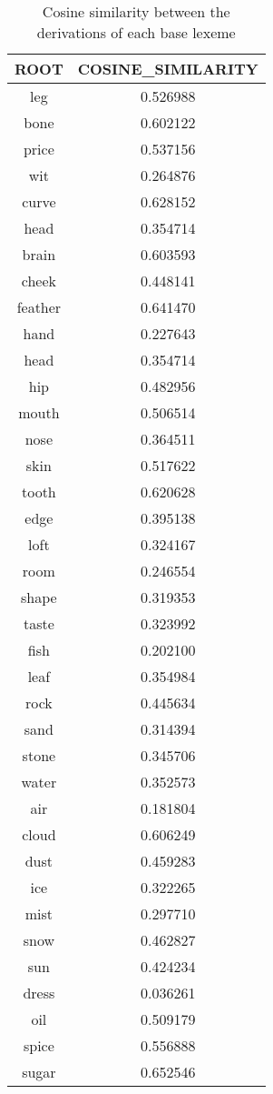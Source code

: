\documentclass[12pt]{article}
\begin{document}
    \begin{table}[p]
    \begin{center}
        \begin{tabular}{||c c||}
        \hline
        ROOT & COSINE\_SIMILARITY \\
        \hline
        \hline
        leg & 0.526988 \\
        bone & 0.602122 \\
        price & 0.537156 \\
        wit & 0.264876 \\
        curve & 0.628152 \\
        head & 0.354714 \\
        brain & 0.603593 \\
        cheek & 0.448141 \\
        feather & 0.641470 \\
        hand & 0.227643 \\
        head & 0.354714 \\
        hip & 0.482956 \\
        mouth & 0.506514 \\
        nose & 0.364511 \\
        skin & 0.517622 \\
        tooth & 0.620628 \\
        edge & 0.395138 \\
        loft & 0.324167 \\
        room & 0.246554 \\
        shape & 0.319353 \\
        taste & 0.323992 \\
        fish & 0.202100 \\
        leaf & 0.354984 \\
        rock & 0.445634 \\
        sand & 0.314394 \\
        stone & 0.345706 \\
        water & 0.352573 \\
        air & 0.181804 \\
        cloud & 0.606249 \\
        dust & 0.459283 \\
        ice & 0.322265 \\
        mist & 0.297710 \\
        snow & 0.462827 \\
        sun & 0.424234 \\
        dress & 0.036261 \\
        oil & 0.509179 \\
        spice & 0.556888 \\
        sugar & 0.652546 \\
        \hline    
            
        \end{tabular}
    \end{center}
    \caption{ Cosine similarity between the derivations of each base lexeme}
    \end{table}
\end{document}
